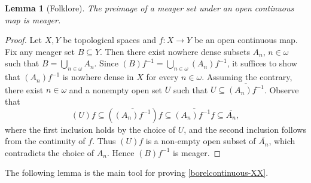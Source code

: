 \documentclass[11pt]{amsart}
\newtheorem{lemma}[theorem]{Lemma}
\theoremstyle{definition}
\newcommand{\w}{\omega}
\newcommand{\Tau}{\mathcal T}
\begin{document}
\begin{lemma}[Folklore]\label{meager preimage}
The preimage of a meager set under an open continuous map is meager.
\end{lemma}
\begin{proof}
Let $X, Y$ be topological spaces and $f: X\rightarrow Y$ be an open continuous map. Fix any meager set $B\subseteq Y$. Then there exist nowhere dense subsets $A_n$, $n\in\w$ such that $B=\bigcup_{n\in\w}A_n$. Since $(B)f^{-1}=\bigcup_{n\in\w}(A_n)f^{-1}$, it suffices to show that $(A_n)f^{-1}$ is nowhere dense in $X$ for every $n\in\w$. 
Assuming the contrary, there exist $n\in\w$ and a nonempty open set $U$ such that $U\subseteq \overline{(A_n)f^{-1}}$. Observe that
$$(U)f\subseteq (\overline{(A_n)f^{-1}})f\subseteq \overline{(A_n)f^{-1}f}\subseteq\overline{A_n},$$
where the first inclusion holds by the choice of $U$, and the second inclusion follows from the continuity of $f$. 
Thus $(U)f$ is a non-empty open subset of $\overline{A_n}$, which contradicts the choice of $A_n$. Hence $(B)f^{-1}$ is meager. 
\end{proof}

The following lemma is the main tool for proving \cref{borelcontinuous-XX}. %
\end{document}
